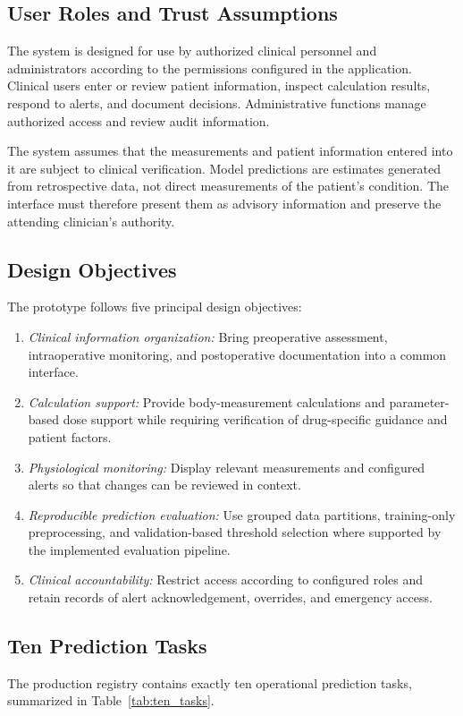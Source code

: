 \documentclass[conference]{IEEEtran}
\begin{document}
\subsection{User Roles and Trust Assumptions}
The system is designed for use by authorized clinical personnel and administrators according to the permissions configured in the application. Clinical users enter or review patient information, inspect calculation results, respond to alerts, and document decisions. Administrative functions manage authorized access and review audit information.

The system assumes that the measurements and patient information entered into it are subject to clinical verification. Model predictions are estimates generated from retrospective data, not direct measurements of the patient's condition. The interface must therefore present them as advisory information and preserve the attending clinician's authority.

\subsection{Design Objectives}
The prototype follows five principal design objectives:
\begin{enumerate}
\item \textit{Clinical information organization:} Bring preoperative assessment, intraoperative monitoring, and postoperative documentation into a common interface.
\item \textit{Calculation support:} Provide body-measurement calculations and parameter-based dose support while requiring verification of drug-specific guidance and patient factors.
\item \textit{Physiological monitoring:} Display relevant measurements and configured alerts so that changes can be reviewed in context.
\item \textit{Reproducible prediction evaluation:} Use grouped data partitions, training-only preprocessing, and validation-based threshold selection where supported by the implemented evaluation pipeline.
\item \textit{Clinical accountability:} Restrict access according to configured roles and retain records of alert acknowledgement, overrides, and emergency access.
\end{enumerate}

\subsection{Ten Prediction Tasks}
The production registry contains exactly ten operational prediction tasks, summarized in Table~\ref{tab:ten_tasks}.
\end{document}
